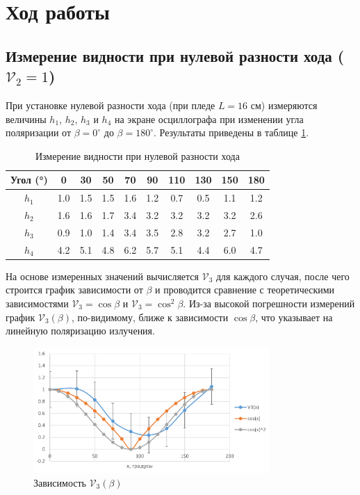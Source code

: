 \documentclass[a4paper]{article}
\begin{document}
\section{Ход работы}

\subsection{Измерение видности при нулевой разности хода ($\mathcal{V}_2 = 1$)}
При установке нулевой разности хода (при пледе $L = 16$ см) измеряются величины $h_1$, $h_2$, $h_3$ и $h_4$ на экране осциллографа при изменении угла поляризации от $\beta = 0^\circ$ до $\beta = 180^\circ$. Результаты приведены в таблице \ref{t1}.

\begin{longtable}[c]{|c|c|c|c|c|c|c|c|c|c|}
\caption{Измерение видности при нулевой разности хода}
\label{t1}\\
\hline
Угол (°) & 0   & 30  & 50  & 70  & 90  & 110 & 130 & 150 & 180 \\ \hline
\endfirsthead
%
\endhead
%
$h_1$              & 1.0 & 1.5 & 1.5 & 1.6 & 1.2 & 0.7 & 0.5 & 1.1 & 1.2 \\ \hline
$h_2$              & 1.6 & 1.6 & 1.7 & 3.4 & 3.2 & 3.2 & 3.2 & 3.2 & 2.6 \\ \hline
$h_3$              & 0.9 & 1.0 & 1.4 & 3.4 & 3.5 & 2.8 & 3.2 & 2.7 & 1.0 \\ \hline
$h_4$              & 4.2 & 5.1 & 4.8 & 6.2 & 5.7 & 5.1 & 4.4 & 6.0 & 4.7 \\ \hline
\end{longtable}

На основе измеренных значений вычисляется $\mathcal{V}_3$ для каждого случая, после чего строится график зависимости от $\beta$ и проводится сравнение с теоретическими зависимостями $\mathcal{V}_3 = \cos \beta$ и $\mathcal{V}_3 = \cos^2 \beta$. Из-за высокой погрешности измерений график $\mathcal{V}_3(\beta)$, по-видимому, ближе к зависимости $\cos \beta$, что указывает на линейную поляризацию излучения.

\begin{figure}[!h]
\centering
\includegraphics[width=0.8\textwidth]{2.png}
\caption{Зависимость $\mathcal{V}_3(\beta)$}
\label{fig:2}
\end{figure}
\end{document}
